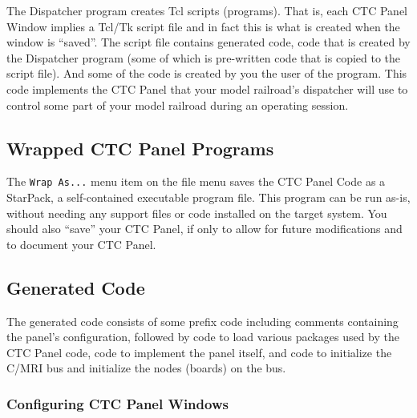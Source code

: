 The Dispatcher program creates Tcl scripts (programs).  That is, each
CTC Panel Window implies a Tcl/Tk script file and in fact this is what
is created when the window is ``saved''.  The script file contains
generated code, code that is created by the Dispatcher program (some of
which is pre-written code that is copied to the script file). And some
of the code is created by you the user of the program. This code
implements the CTC Panel that your model railroad's dispatcher will use
to control some part of your model railroad during an operating session.

\subsection{Wrapped CTC Panel Programs}
\label{sect:dispatcher:wrapas}

The \verb=Wrap As...= menu item on the file menu saves the CTC Panel
Code as a StarPack, a self-contained executable program file.  This
program can be run as-is, without needing any support files or code
installed on the target system.  You should also ``save'' your CTC
Panel, if only to allow for future modifications and to document your
CTC Panel.

\subsection{Generated Code}

The generated code consists of some prefix code including comments
containing the panel's configuration, followed by code to load various
packages used by the CTC Panel code, code to implement the panel
itself, and code to initialize the C/MRI bus and initialize the nodes
(boards) on the bus.

\subsubsection{Configuring CTC Panel Windows}

